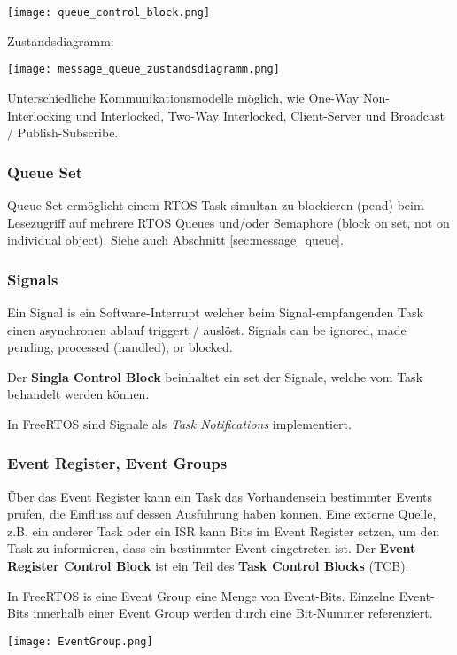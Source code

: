 \texttt{[image: queue\_control\_block.png]}

Zustandsdiagramm:

\texttt{[image: message\_queue\_zustandsdiagramm.png]}

Unterschiedliche Kommunikationsmodelle möglich, wie One-Way Non-Interlocking und Interlocked, Two-Way Interlocked, Client-Server und Broadcast / Publish-Subscribe.


\subsubsection{Queue Set}

Queue Set ermöglicht einem RTOS Task simultan zu blockieren (pend) beim Lesezugriff auf
mehrere RTOS Queues und/oder Semaphore (block on set, not on individual object).
Siehe auch Abschnitt \ref{sec:message_queue}.


\subsubsection{Signals}

Ein Signal is ein Software-Interrupt welcher beim Signal-empfangenden Task einen asynchronen ablauf triggert / auslöst.
Signals can be ignored, made pending, processed (handled), or blocked.

Der \textbf{Singla Control Block} beinhaltet ein set der Signale, welche vom Task behandelt werden können.

In FreeRTOS sind Signale als \textit{Task Notifications} implementiert.


\subsubsection{Event Register, Event Groups}

Über das Event Register kann ein Task das Vorhandensein bestimmter Events prüfen,
die Einfluss auf dessen Ausführung haben können.
Eine externe Quelle, z.B. ein anderer Task oder ein ISR kann Bits im Event Register setzen,
um den Task zu informieren, dass ein bestimmter Event eingetreten ist.
Der \textbf{Event Register Control Block} ist ein Teil des \textbf{Task Control Blocks} (TCB).

In FreeRTOS is eine Event Group eine Menge von Event-Bits.
Einzelne Event-Bits innerhalb einer Event Group werden durch eine Bit-Nummer referenziert.

\texttt{[image: EventGroup.png]}

